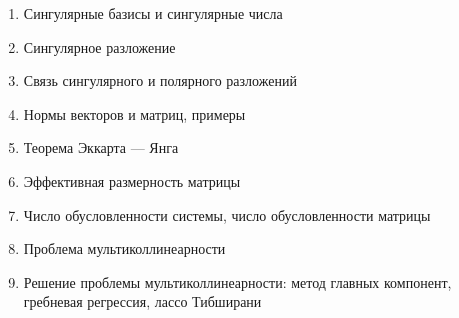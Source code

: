 \documentclass[12pt,oneside,openany]{article}
\begin{document}
\begin{enumerate}
    \item Сингулярные базисы и сингулярные числа
    \item Сингулярное разложение
    \item Связь сингулярного и полярного разложений

    \item Нормы векторов и матриц, примеры
    \item Теорема Эккарта --- Янга
    \item Эффективная размерность матрицы
    
    \item Число обусловленности системы, число обусловленности матрицы
    \item Проблема мультиколлинеарности
    \item Решение проблемы мультиколлинеарности: метод главных компонент, гребневая регрессия, лассо Тибширани

\end{enumerate}
\end{document}
